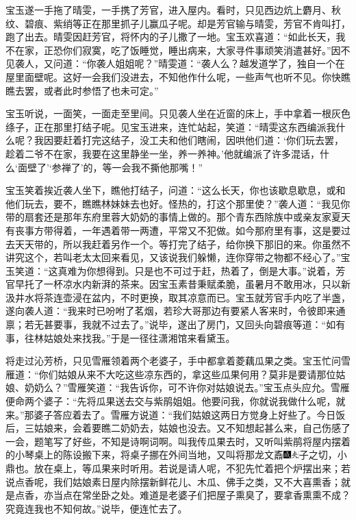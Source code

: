 宝玉遂一手拖了晴雯，一手携了芳官，进入屋内。看时，只见西边炕上麝月、秋纹、碧痕、紫绡等正在那里抓子儿赢瓜子呢。却是芳官输与晴雯，芳官不肯叫打，跑了出去。晴雯因赶芳官，将怀内的子儿撒了一地。宝玉欢喜道：“如此长天，我不在家，正恐你们寂寞，吃了饭睡觉，睡出病来，大家寻件事顽笑消遣甚好。”因不见袭人，又问道：“你袭人姐姐呢？”晴雯道：“袭人么？越发道学了，独自一个在屋里面壁呢。这好一会我们没进去，不知他作什么呢，一些声气也听不见。你快瞧瞧去罢，或者此时参悟了也未可定。”

宝玉听说，一面笑，一面走至里间。只见袭人坐在近窗的床上，手中拿着一根灰色绦子，正在那里打结子呢。见宝玉进来，连忙站起，笑道：“晴雯这东西编派我什么呢？我因要赶着打完这结子，没工夫和他们瞎闹，因哄他们道：‘你们玩去罢，趁着二爷不在家，我要在这里静坐一坐，养一养神。’他就编派了许多混话，什么‘面壁了’‘参禅了’的，等一会我不撕他那嘴！”

宝玉笑着挨近袭人坐下，瞧他打结子，问道：“这么长天，你也该歇息歇息，或和他们玩去，要不，瞧瞧林妹妹去也好。怪热的，打这个那里使？”袭人道：“我见你带的扇套还是那年东府里蓉大奶奶的事情上做的。那个青东西除族中或亲友家夏天有丧事方带得着，一年遇着带一两遭，平常又不犯做。如今那府里有事，这是要过去天天带的，所以我赶着另作一个。等打完了结子，给你换下那旧的来。你虽然不讲究这个，若叫老太太回来看见，又该说我们躲懒，连你穿带之物都不经心了。”宝玉笑道：“这真难为你想得到。只是也不可过于赶，热着了，倒是大事。”说着，芳官早托了一杯凉水内新湃的茶来。因宝玉素昔秉赋柔脆，虽暑月不敢用冰，只以新汲井水将茶连壶浸在盆内，不时更换，取其凉意而已。宝玉就芳官手内吃了半盏，遂向袭人道：“我来时已吩咐了茗烟，若珍大哥那边有要紧人客来时，令彼即来通禀；若无甚要事，我就不过去了。”说毕，遂出了房门，又回头向碧痕等道：“如有事，往林姑娘处来找我。”于是一径往潇湘馆来看黛玉。

将走过沁芳桥，只见雪雁领着两个老婆子，手中都拿着菱藕瓜果之类。宝玉忙问雪雁道：“你们姑娘从来不大吃这些凉东西的，拿这些瓜果何用？莫非是要请那位姑娘、奶奶么？”雪雁笑道：“我告诉你，可不许你对姑娘说去。”宝玉点头应允。雪雁便命两个婆子：“先将瓜果送去交与紫鹃姐姐。他要问我，你就说我做什么呢，就来。”那婆子答应着去了。雪雁方说道：“我们姑娘这两日方觉身上好些了。今日饭后，三姑娘来，会着要瞧二奶奶去，姑娘也没去。又不知想起甚么来，自己伤感了一会，题笔写了好些，不知是诗啊词啊。叫我传瓜果去时，又听叫紫鹃将屋内摆着的小琴桌上的陈设搬下来，将桌子挪在外间当地，又叫将那龙文鼒{\includegraphics[width=3mm]{../Images/00005}\includegraphics[width=3mm]{../Images/00012}\footnotesize \kaishu 子之切，小鼎也。}放在桌上，等瓜果来时听用。若说是请人呢，不犯先忙着把个炉摆出来；若说点香呢，我们姑娘素日屋内除摆新鲜花儿、木瓜、佛手之类，又不大喜熏香；就是点香，亦当点在常坐卧之处。难道是老婆子们把屋子熏臭了，要拿香熏熏不成？究竟连我也不知何故。”说毕，便连忙去了。

